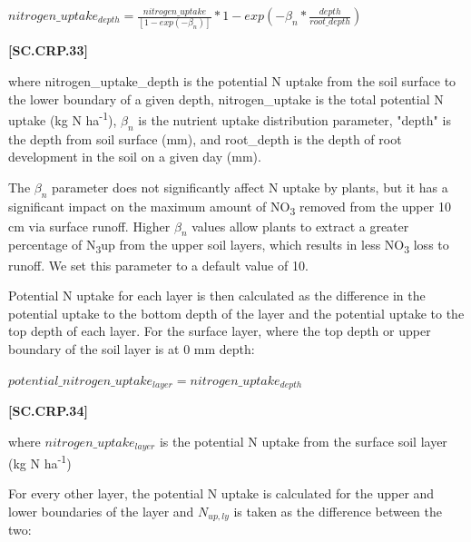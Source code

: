     \begin{center}
        \(nitrogen\_uptake_{depth}= \frac{nitrogen\_uptake}{[1-exp(-\beta_{n})]} * 1-exp(-\beta_{n} * \frac{depth}{root\_depth})\)
    \end{center}
        \vspace{0.5cm}
    
            {\raggedleft \textbf{[SC.CRP.33]}\par}
            \vspace{0.5cm}

where nitrogen\_uptake\_depth is the potential N uptake from the soil surface to the lower boundary of a given depth, nitrogen\_uptake is the total potential N uptake (kg N ha\textsuperscript{-1}), \(\beta_n\) is the nutrient uptake distribution parameter, "depth" is the depth from soil surface (mm), and root\_depth is the depth of root development in the soil on a given day (mm).

The \(\beta_n\) parameter does not significantly affect N uptake by plants, but it has a significant impact on the maximum amount of NO\textsubscript{3} removed from the upper 10 cm via surface runoff. Higher \(\beta_n\) values allow plants to extract a greater percentage of N\textsubscript{3}up from the upper soil layers, which results in less NO\textsubscript{3} loss to runoff. We set this parameter to a default value of 10.

Potential N uptake for each layer is then calculated as the difference in the potential uptake to the bottom depth of the layer and the potential uptake to the top depth of each layer. For the surface layer, where the top depth or upper boundary of the soil layer is at 0 mm depth:
    \vspace{0.2cm}

    \begin{center}
        \(potential\_nitrogen\_uptake_{layer}=nitrogen\_uptake_{depth}\)
    \end{center}
        \vspace{0.5cm}
    
            {\raggedleft \textbf{[SC.CRP.34]}\par}
            \vspace{0.5cm}

where \(nitrogen\_uptake_{layer}\) is the potential N uptake from the surface soil layer (kg N ha\textsuperscript{-1})

For every other layer, the potential N uptake is calculated for the upper and lower boundaries of the layer and \(N_{up,ly}\) is taken as the difference between the two:
    \vspace{0.2cm}

